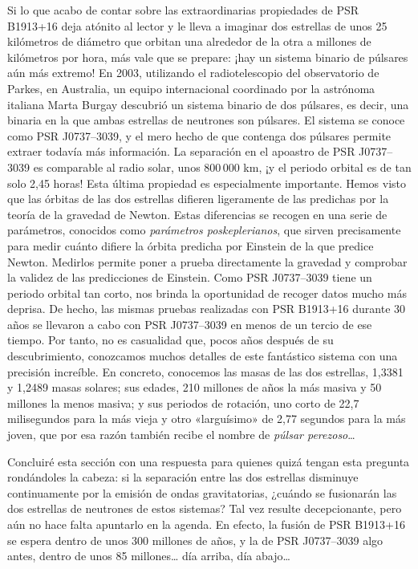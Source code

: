 Si lo que acabo de contar sobre las extraordinarias propiedades de PSR B1913+16 deja atónito al lector y le lleva a imaginar dos estrellas de unos 25 kilómetros de diámetro que orbitan una alrededor de la otra a millones de kilómetros por hora, más vale que se prepare: ¡hay un sistema binario de púlsares aún más extremo! En 2003, utilizando el radiotelescopio del observatorio de Parkes, en Australia, un equipo internacional coordinado por la astrónoma italiana Marta Burgay descubrió un sistema binario de dos púlsares, es decir, una binaria en la que ambas estrellas de neutrones son púlsares. El sistema se conoce como PSR J0737--3039, y el mero hecho de que contenga dos púlsares permite extraer todavía más información. La separación en el apoastro de PSR J0737--3039 es comparable al radio solar, unos 800\,000 km, ¡y el periodo orbital es de tan solo 2,45 horas! Esta última propiedad es especialmente importante. Hemos visto que las órbitas de las dos estrellas difieren ligeramente de las predichas por la teoría de la gravedad de Newton. Estas diferencias se recogen en una serie de parámetros, conocidos como \emph{parámetros poskeplerianos}, que sirven precisamente para medir cuánto difiere la órbita predicha por Einstein de la que predice Newton. Medirlos permite poner a prueba directamente la gravedad y comprobar la validez de las predicciones de Einstein. Como PSR J0737--3039 tiene un periodo orbital tan corto, nos brinda la oportunidad de recoger datos mucho más deprisa. De hecho, las mismas pruebas realizadas con PSR B1913+16 durante 30 años se llevaron a cabo con PSR J0737--3039 en menos de un tercio de ese tiempo. Por tanto, no es casualidad que, pocos años después de su descubrimiento, conozcamos muchos detalles de este fantástico sistema con una precisión increíble. En concreto, conocemos las masas de las dos estrellas, 1,3381 y 1,2489 masas solares; sus edades, 210 millones de años la más masiva y 50 millones la menos masiva; y sus periodos de rotación, uno corto de 22,7 milisegundos para la más vieja y otro «larguísimo» de 2,77 segundos para la más joven, que por esa razón también recibe el nombre de \emph{púlsar perezoso}\ldots{}

Concluiré esta sección con una respuesta para quienes quizá tengan esta pregunta rondándoles la cabeza: si la separación entre las dos estrellas disminuye continuamente por la emisión de ondas gravitatorias, ¿cuándo se fusionarán las dos estrellas de neutrones de estos sistemas? Tal vez resulte decepcionante, pero aún no hace falta apuntarlo en la agenda. En efecto, la fusión de PSR B1913+16 se espera dentro de unos 300 millones de años, y la de PSR J0737--3039 algo antes, dentro de unos 85 millones\ldots{} día arriba, día abajo\ldots{}

